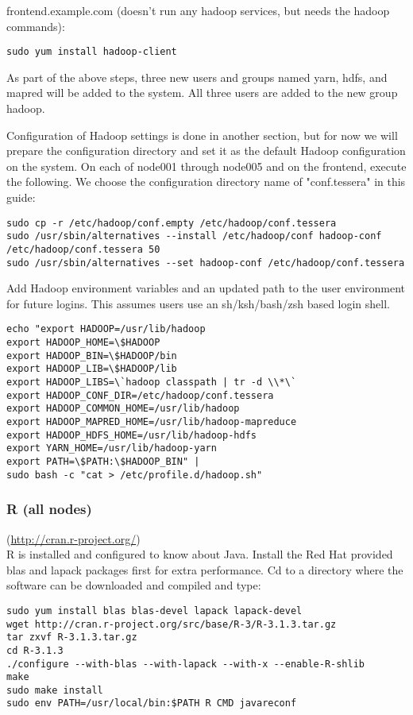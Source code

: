 frontend.example.com (doesn't run any hadoop services, but needs the hadoop commands):
\begin{verbatim}
sudo yum install hadoop-client
\end{verbatim}

As part of the above steps, three new users and groups named yarn, hdfs,
and mapred will be added to the system.  All three users are added to
the new group hadoop.

Configuration of Hadoop settings is done in another section, but for now
we will prepare the configuration directory and set it as the default
Hadoop configuration on the system.  On each of node001 through node005
and on the frontend, execute the following.  We choose the configuration
directory name of "conf.tessera" in this guide:

\begin{verbatim}
sudo cp -r /etc/hadoop/conf.empty /etc/hadoop/conf.tessera
sudo /usr/sbin/alternatives --install /etc/hadoop/conf hadoop-conf /etc/hadoop/conf.tessera 50
sudo /usr/sbin/alternatives --set hadoop-conf /etc/hadoop/conf.tessera
\end{verbatim}

Add Hadoop environment variables and an updated path to the user
environment for future logins.  This assumes users use an sh/ksh/bash/zsh
based login shell.

\begin{verbatim}
echo "export HADOOP=/usr/lib/hadoop
export HADOOP_HOME=\$HADOOP	
export HADOOP_BIN=\$HADOOP/bin
export HADOOP_LIB=\$HADOOP/lib
export HADOOP_LIBS=\`hadoop classpath | tr -d \\*\`
export HADOOP_CONF_DIR=/etc/hadoop/conf.tessera
export HADOOP_COMMON_HOME=/usr/lib/hadoop
export HADOOP_MAPRED_HOME=/usr/lib/hadoop-mapreduce
export HADOOP_HDFS_HOME=/usr/lib/hadoop-hdfs
export YARN_HOME=/usr/lib/hadoop-yarn
export PATH=\$PATH:\$HADOOP_BIN" | 
sudo bash -c "cat > /etc/profile.d/hadoop.sh"
\end{verbatim}

\subsubsection{R (all nodes)} (\url{http://cran.r-project.org/})\\
R is installed and configured to know about Java.  Install the Red Hat
provided blas and lapack packages first for extra performance.  Cd to
a directory where the software can be downloaded and compiled and type:
\begin{verbatim}
sudo yum install blas blas-devel lapack lapack-devel
wget http://cran.r-project.org/src/base/R-3/R-3.1.3.tar.gz
tar zxvf R-3.1.3.tar.gz
cd R-3.1.3
./configure --with-blas --with-lapack --with-x --enable-R-shlib
make
sudo make install
sudo env PATH=/usr/local/bin:$PATH R CMD javareconf
\end{verbatim}

